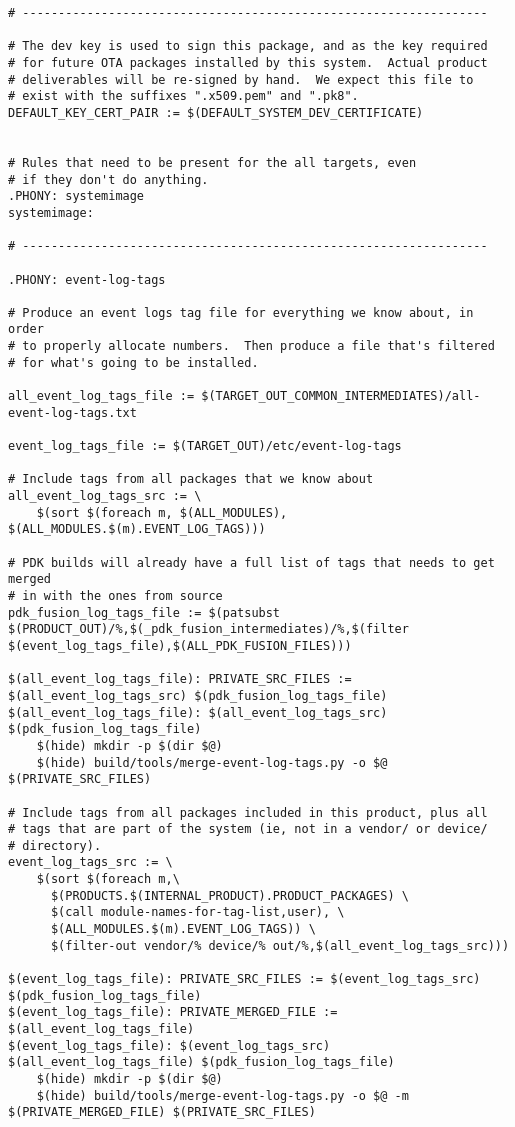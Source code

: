 \documentclass[12pt,a4paper]{article}
\begin{document}
\begin{verbatim}
# -----------------------------------------------------------------

# The dev key is used to sign this package, and as the key required
# for future OTA packages installed by this system.  Actual product
# deliverables will be re-signed by hand.  We expect this file to
# exist with the suffixes ".x509.pem" and ".pk8".
DEFAULT_KEY_CERT_PAIR := $(DEFAULT_SYSTEM_DEV_CERTIFICATE)


# Rules that need to be present for the all targets, even
# if they don't do anything.
.PHONY: systemimage
systemimage:

# -----------------------------------------------------------------

.PHONY: event-log-tags

# Produce an event logs tag file for everything we know about, in order
# to properly allocate numbers.  Then produce a file that's filtered
# for what's going to be installed.

all_event_log_tags_file := $(TARGET_OUT_COMMON_INTERMEDIATES)/all-event-log-tags.txt

event_log_tags_file := $(TARGET_OUT)/etc/event-log-tags

# Include tags from all packages that we know about
all_event_log_tags_src := \
    $(sort $(foreach m, $(ALL_MODULES), $(ALL_MODULES.$(m).EVENT_LOG_TAGS)))

# PDK builds will already have a full list of tags that needs to get merged
# in with the ones from source
pdk_fusion_log_tags_file := $(patsubst $(PRODUCT_OUT)/%,$(_pdk_fusion_intermediates)/%,$(filter $(event_log_tags_file),$(ALL_PDK_FUSION_FILES)))

$(all_event_log_tags_file): PRIVATE_SRC_FILES := $(all_event_log_tags_src) $(pdk_fusion_log_tags_file)
$(all_event_log_tags_file): $(all_event_log_tags_src) $(pdk_fusion_log_tags_file)
	$(hide) mkdir -p $(dir $@)
	$(hide) build/tools/merge-event-log-tags.py -o $@ $(PRIVATE_SRC_FILES)

# Include tags from all packages included in this product, plus all
# tags that are part of the system (ie, not in a vendor/ or device/
# directory).
event_log_tags_src := \
    $(sort $(foreach m,\
      $(PRODUCTS.$(INTERNAL_PRODUCT).PRODUCT_PACKAGES) \
      $(call module-names-for-tag-list,user), \
      $(ALL_MODULES.$(m).EVENT_LOG_TAGS)) \
      $(filter-out vendor/% device/% out/%,$(all_event_log_tags_src)))

$(event_log_tags_file): PRIVATE_SRC_FILES := $(event_log_tags_src) $(pdk_fusion_log_tags_file)
$(event_log_tags_file): PRIVATE_MERGED_FILE := $(all_event_log_tags_file)
$(event_log_tags_file): $(event_log_tags_src) $(all_event_log_tags_file) $(pdk_fusion_log_tags_file)
	$(hide) mkdir -p $(dir $@)
	$(hide) build/tools/merge-event-log-tags.py -o $@ -m $(PRIVATE_MERGED_FILE) $(PRIVATE_SRC_FILES)


\end{verbatim}
\end{document}
